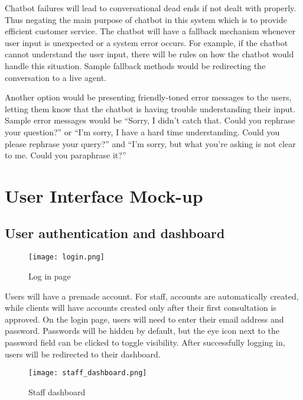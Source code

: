 \begin{itemize}
	\subitem Chatbot failures will lead to conversational dead ends if not dealt with properly. Thus negating the main purpose of chatbot in this system which is to provide efficient customer service. The chatbot will have a fallback mechanism whenever user input is unexpected or a system error occurs. For example, if the chatbot cannot understand the user input, there will be rules on how the chatbot would handle this situation. Sample fallback methods would be redirecting the conversation to a live agent. 
	
	\subitem Another option would be presenting friendly-toned error messages to the users, letting them know that the chatbot is having trouble understanding their input. Sample error messages would be “Sorry, I didn't catch that. Could you rephrase your question?” or “I'm sorry, I have a hard time understanding. Could you please rephrase your query?” and “I'm sorry, but what you're asking is not clear to me. Could you paraphrase it?” \newline
	
\end{itemize}


\section{User Interface Mock-up}

\subsection{User authentication and dashboard}

\begin{figure}[h]
	\centering 
	\texttt{[image: login.png]}
	\caption{Log in page}
	\label{fig:login}
\end{figure}

Users will have a premade account. For staff, accounts are automatically created, while clients will have accounts created only after their first consultation is approved. On the login page, users will need to enter their email address and password. Passwords will be hidden by default, but the eye icon next to the password field can be clicked to toggle visibility. After successfully logging in, users will be redirected to their dashboard.

\begin{figure}[h]
	\centering 
	\texttt{[image: staff\_dashboard.png]}
	\caption{Staff dashboard}
	\label{fig:staff_dashboard}
\end{figure}


